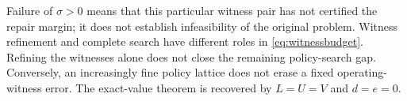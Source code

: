 Failure of $\sigma>0$ means that this particular witness pair has not certified the repair margin; it does not establish infeasibility of the original problem. Witness refinement and complete search have different roles in \eqref{eq:witnessbudget}. Refining the witnesses alone does not close the remaining policy-search gap. Conversely, an increasingly fine policy lattice does not erase a fixed operating-witness error. The exact-value theorem is recovered by $L=U=V$ and $d=e=0$.
